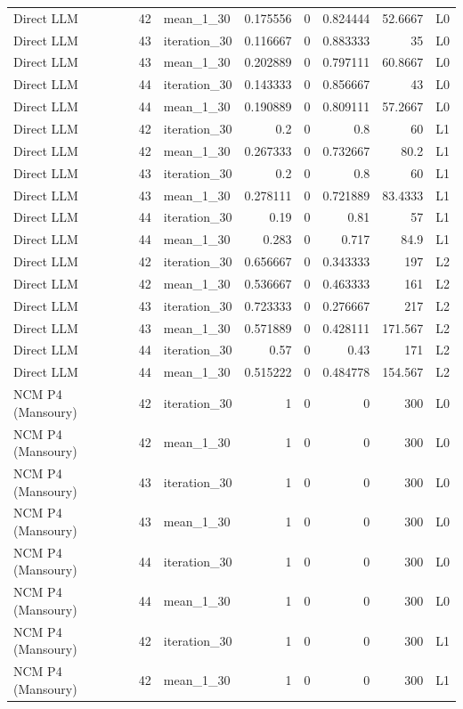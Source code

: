 \begin{table}[htbp!]
\begin{tabular}{lrlrrrrl}
Direct LLM & 42 & mean\_1\_30 & 0.175556 & 0 & 0.824444 & 52.6667 & L0 \\
Direct LLM & 43 & iteration\_30 & 0.116667 & 0 & 0.883333 & 35 & L0 \\
Direct LLM & 43 & mean\_1\_30 & 0.202889 & 0 & 0.797111 & 60.8667 & L0 \\
Direct LLM & 44 & iteration\_30 & 0.143333 & 0 & 0.856667 & 43 & L0 \\
Direct LLM & 44 & mean\_1\_30 & 0.190889 & 0 & 0.809111 & 57.2667 & L0 \\
Direct LLM & 42 & iteration\_30 & 0.2 & 0 & 0.8 & 60 & L1 \\
Direct LLM & 42 & mean\_1\_30 & 0.267333 & 0 & 0.732667 & 80.2 & L1 \\
Direct LLM & 43 & iteration\_30 & 0.2 & 0 & 0.8 & 60 & L1 \\
Direct LLM & 43 & mean\_1\_30 & 0.278111 & 0 & 0.721889 & 83.4333 & L1 \\
Direct LLM & 44 & iteration\_30 & 0.19 & 0 & 0.81 & 57 & L1 \\
Direct LLM & 44 & mean\_1\_30 & 0.283 & 0 & 0.717 & 84.9 & L1 \\
Direct LLM & 42 & iteration\_30 & 0.656667 & 0 & 0.343333 & 197 & L2 \\
Direct LLM & 42 & mean\_1\_30 & 0.536667 & 0 & 0.463333 & 161 & L2 \\
Direct LLM & 43 & iteration\_30 & 0.723333 & 0 & 0.276667 & 217 & L2 \\
Direct LLM & 43 & mean\_1\_30 & 0.571889 & 0 & 0.428111 & 171.567 & L2 \\
Direct LLM & 44 & iteration\_30 & 0.57 & 0 & 0.43 & 171 & L2 \\
Direct LLM & 44 & mean\_1\_30 & 0.515222 & 0 & 0.484778 & 154.567 & L2 \\
NCM P4 (Mansoury) & 42 & iteration\_30 & 1 & 0 & 0 & 300 & L0 \\
NCM P4 (Mansoury) & 42 & mean\_1\_30 & 1 & 0 & 0 & 300 & L0 \\
NCM P4 (Mansoury) & 43 & iteration\_30 & 1 & 0 & 0 & 300 & L0 \\
NCM P4 (Mansoury) & 43 & mean\_1\_30 & 1 & 0 & 0 & 300 & L0 \\
NCM P4 (Mansoury) & 44 & iteration\_30 & 1 & 0 & 0 & 300 & L0 \\
NCM P4 (Mansoury) & 44 & mean\_1\_30 & 1 & 0 & 0 & 300 & L0 \\
NCM P4 (Mansoury) & 42 & iteration\_30 & 1 & 0 & 0 & 300 & L1 \\
NCM P4 (Mansoury) & 42 & mean\_1\_30 & 1 & 0 & 0 & 300 & L1 \\

\end{tabular}
\end{table}
